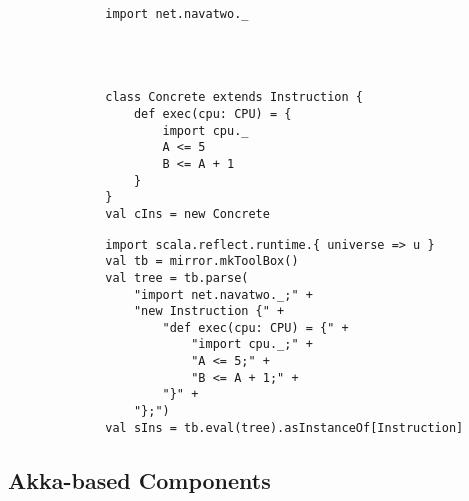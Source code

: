 \begin{figure}[!h]
    \begin{minipage}{0.5\textwidth}
        \centering
        \begin{verbatim}
        import net.navatwo._
        
        
        
        
        class Concrete extends Instruction {
            def exec(cpu: CPU) = {
                import cpu._
                A <= 5    
                B <= A + 1
            }
        }
        val cIns = new Concrete
        \end{verbatim}
        \label{lst:procsim-scala:concrete-instruction-def}
    \end{minipage}
    \begin{minipage}{0.5\textwidth}
        \begin{verbatim}
        import scala.reflect.runtime.{ universe => u }
        val tb = mirror.mkToolBox()
        val tree = tb.parse(
            "import net.navatwo._;" +
            "new Instruction {" +
                "def exec(cpu: CPU) = {" +
                    "import cpu._;" +
                    "A <= 5;" +
                    "B <= A + 1;" +
                "}" +
            "};")
        val sIns = tb.eval(tree).asInstanceOf[Instruction]
        \end{verbatim}
        \label{lst:procsim-scala:reify-instruction-def}
    \end{minipage}
\end{figure}

%
%        
%        

\subsection{Akka-based Components}

